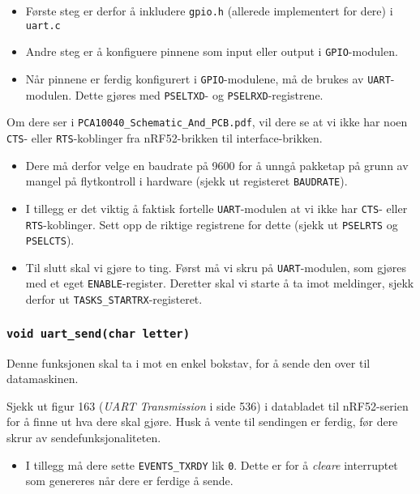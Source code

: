 \begin{itemize}
    \item Første steg er derfor å inkludere \verb|gpio.h| (allerede implementert for dere) i \verb|uart.c|
    \item Andre steg er å konfiguere pinnene som input eller output i \verb|GPIO|-modulen.
    \item Når pinnene er ferdig konfigurert i \verb|GPIO|-modulene, må de brukes av \verb|UART|-modulen. Dette gjøres med \verb|PSELTXD|- og \verb|PSELRXD|-registrene.
\end{itemize}



Om dere ser i \verb|PCA10040_Schematic_And_PCB.pdf|, vil dere se at vi ikke har noen \verb|CTS|- eller \verb|RTS|-koblinger fra nRF52-brikken til interface-brikken. 

\begin{itemize}
    \item Dere må derfor velge en baudrate på 9600 for å unngå pakketap på grunn av mangel på flytkontroll i hardware (sjekk ut registeret \verb|BAUDRATE|).
    \item I tillegg er det viktig å faktisk fortelle \verb|UART|-modulen at vi ikke har \verb|CTS|- eller \verb|RTS|-koblinger. Sett opp de riktige registrene for dette (sjekk ut \verb|PSELRTS| og \verb|PSELCTS|).
    \item 

Til slutt skal vi gjøre to ting. Først må vi skru på \verb|UART|-modulen, som gjøres med et eget \verb|ENABLE|-register. Deretter skal vi starte å ta imot meldinger, sjekk derfor ut \verb|TASKS_STARTRX|-registeret. 
\end{itemize}







\cprotect\subsubsection{\lstinline{void uart_send(char letter)}}

Denne funksjonen skal ta i mot en enkel bokstav, for å sende den over til datamaskinen.

Sjekk ut figur 163 (\textit{UART Transmission} i side 536) i databladet til nRF52-serien for å finne ut hva dere skal gjøre. Husk å vente til sendingen er ferdig, før dere skrur av sendefunksjonaliteten.

\begin{itemize}
    \item I tillegg må dere sette \verb|EVENTS_TXRDY| lik \verb|0|. Dette er for å {\it cleare} interruptet som genereres når dere er ferdige å sende.
\end{itemize}

